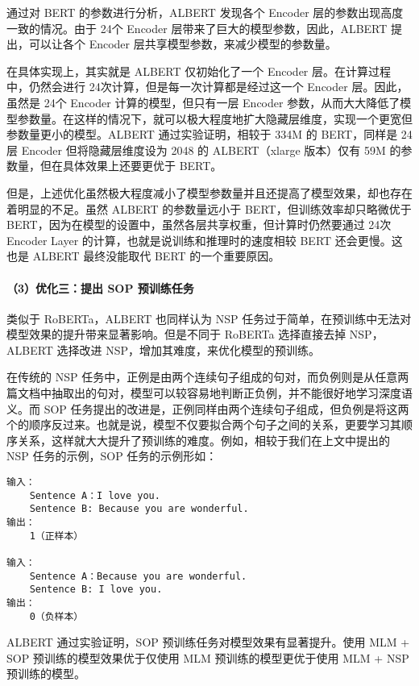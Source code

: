 \documentclass[12pt,a4paper]{book}
\begin{document}
通过对 BERT 的参数进行分析，ALBERT 发现各个 Encoder
层的参数出现高度一致的情况。由于 24个 Encoder
层带来了巨大的模型参数，因此，ALBERT 提出，可以让各个 Encoder
层共享模型参数，来减少模型的参数量。

在具体实现上，其实就是 ALBERT 仅初始化了一个 Encoder
层。在计算过程中，仍然会进行 24次计算，但是每一次计算都是经过这一个
Encoder 层。因此，虽然是 24个 Encoder 计算的模型，但只有一层 Encoder
参数，从而大大降低了模型参数量。在这样的情况下，就可以极大程度地扩大隐藏层维度，实现一个更宽但参数量更小的模型。ALBERT
通过实验证明，相较于 334M 的 BERT，同样是 24层 Encoder
但将隐藏层维度设为 2048 的 ALBERT（xlarge 版本）仅有 59M
的参数量，但在具体效果上还要更优于 BERT。

但是，上述优化虽然极大程度减小了模型参数量并且还提高了模型效果，却也存在着明显的不足。虽然
ALBERT 的参数量远小于 BERT，但训练效率却只略微优于
BERT，因为在模型的设置中，虽然各层共享权重，但计算时仍然要通过 24次
Encoder Layer 的计算，也就是说训练和推理时的速度相较 BERT
还会更慢。这也是 ALBERT 最终没能取代 BERT 的一个重要原因。

\paragraph{（3）优化三：提出 SOP
预训练任务}\label{ux4f18ux5316ux4e09ux63d0ux51fa-sop-ux9884ux8badux7ec3ux4efbux52a1}

类似于 RoBERTa，ALBERT 也同样认为 NSP
任务过于简单，在预训练中无法对模型效果的提升带来显著影响。但是不同于
RoBERTa 选择直接去掉 NSP，ALBERT 选择改进
NSP，增加其难度，来优化模型的预训练。

在传统的 NSP
任务中，正例是由两个连续句子组成的句对，而负例则是从任意两篇文档中抽取出的句对，模型可以较容易地判断正负例，并不能很好地学习深度语义。而
SOP
任务提出的改进是，正例同样由两个连续句子组成，但负例是将这两个的顺序反过来。也就是说，模型不仅要拟合两个句子之间的关系，更要学习其顺序关系，这样就大大提升了预训练的难度。例如，相较于我们在上文中提出的
NSP 任务的示例，SOP 任务的示例形如：

\begin{verbatim}
输入：
    Sentence A：I love you.
    Sentence B: Because you are wonderful.
输出：
    1（正样本）

输入：
    Sentence A：Because you are wonderful.
    Sentence B: I love you.
输出：
    0（负样本）
\end{verbatim}

ALBERT 通过实验证明，SOP 预训练任务对模型效果有显著提升。使用 MLM + SOP
预训练的模型效果优于仅使用 MLM 预训练的模型更优于使用 MLM + NSP
预训练的模型。
\end{document}
